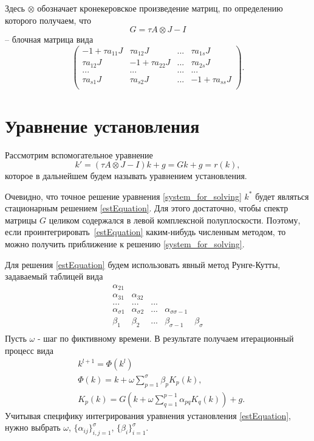 \documentclass[a4paper, 14pt]{extreport} %
\begin{document}
Здесь $\otimes$ обозначает кронекеровское произведение матриц\cite{dekker}, по
определению которого получаем, что $$G=\tau A\otimes J-I$$ -- блочная
матрица вида
\begin{equation}
\left(
\begin{array}{llll}
-1+\tau a_{11}J& \tau a_{12}J&...&\tau a_{1s}J\\
 \tau a_{12}J&-1+\tau a_{22}J&...&\tau a_{2s}J\\
...&...&...&...\\
\tau a_{s1}J& \tau a_{s2}J&...&-1+\tau a_{ss}J\\
\end{array}
\right ).
\end{equation}


\section{Уравнение установления}
Рассмотрим вспомогательное уравнение
\begin{equation}
\label{estEquation}
k'=(\tau A\otimes J-I)k+g=Gk+g = r(k),
\end{equation}
которое в дальнейшем будем называть уравнением установления.

Очевидно, что точное решение уравнения \eqref{system_for_solving}
$k^*$ будет являться стационарным решением \eqref{estEquation}. Для
этого достаточно, чтобы спектр матрицы $G$ целиком содержался в
левой комплексной полуплоскости. Поэтому, если проинтегрировать~\eqref{estEquation}  каким-нибудь численным методом, то можно
получить приближение к решению \eqref{system_for_solving}.

Для решения \eqref{estEquation} будем использовать явный метод Рунге-Кутты, задаваемый таблицей вида
\begin{equation}
\label{auxilary_method_table}
\begin{array}{lllll}
 \alpha_{21}& & & &  \\
 \alpha_{31}&\alpha_{32} & & &  \\
 ...& ...& ...& &\\
 \alpha_{\sigma1}& \alpha_{\sigma2}&... &\alpha_{\sigma\sigma-1}&  \\
\hline
 \beta_1&\beta_2 &...&\beta_{\sigma-1}& \beta_\sigma\\
\end{array}
\end{equation}
Пусть $\omega$ - шаг по фиктивному времени. В результате получаем
итерационный процесс вида
\begin{equation}\label{ipe_gf}
\begin{aligned}
&k^{l+1}=\Phi(k^{l})\\
&\Phi(k)=k+\omega \sum_{p=1}^\sigma\beta_pK_p(k),\\
&K_p(k)=G (k +\omega\sum_{q=1}^{p-1}\alpha_{pq} K_q(k))+g.
\end{aligned}
\end{equation}
Учитывая специфику интегрирования уравнения установления \eqref{estEquation}, нужно выбрать  $\omega$, $\{\alpha_{ij}\}_{i,j=1}^{\sigma}$, $\{\beta_i\}_{i=1}^{\sigma}$.
\end{document}
